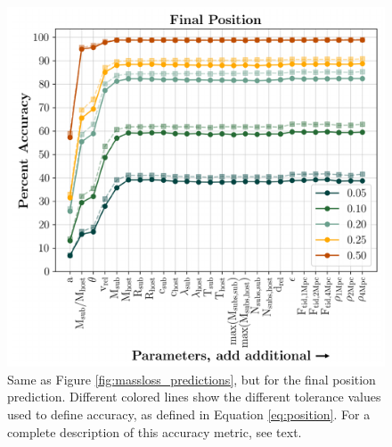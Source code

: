 \documentclass[fleqn,usenatbib]{mnras}
\begin{document}
{\begin{figure}
	\includegraphics[width=\columnwidth]{Figures/position_predictions}
	\vspace{-15pt}
    \caption{Same as Figure \ref{fig:massloss_predictions}, but for the final position prediction. Different colored lines show the different tolerance values used to define accuracy, as defined in Equation \ref{eq:position}. For a complete description of this accuracy metric, see text.}
    \label{fig:position_predictions}
\end{figure}

}
\end{document}

